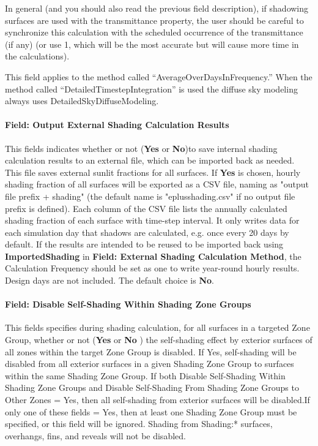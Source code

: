 In general (and you should also read the previous field description), if shadowing surfaces are used with the transmittance property, the user should be careful to synchronize this calculation with the scheduled occurrence of the transmittance (if any) (or use 1, which will be the most accurate but will cause more time in the calculations).

This field applies to the method called ``AverageOverDaysInFrequency.'' When the method called ``DetailedTimestepIntegration'' is used the diffuse sky modeling always uses DetailedSkyDiffuseModeling.

\paragraph{Field: Output External Shading Calculation Results}\label{field-output-external-shading-calculation results}
This fields indicates whether or not (\textbf{Yes} or \textbf{No})to save internal shading calculation results to an external file, which can be imported back as needed. This file saves external sunlit fractions for all surfaces. If \textbf{Yes} is chosen, hourly shading fraction of all surfaces will be exported as a CSV file, naming as "output file prefix + shading" (the default name is "eplusshading.csv" if no output file prefix is defined). Each column of the CSV file lists the annually calculated shading fraction of each surface with time-step interval. It only writes data for each simulation day that shadows are calculated, e.g. once every 20 days by default. If the results are intended to be reused to be imported  back using \textbf{ImportedShading} in \textbf{Field: External Shading Calculation Method}, the Calculation Frequency should be set as one to write year-round hourly results. Design days are not included. The default choice is \textbf{No}.

\paragraph{Field: Disable Self-Shading Within Shading Zone Groups}\label{fieldself--disable-shading-within-a-zone-group}
This fields specifies during shading calculation, for all surfaces in a targeted Zone Group, whether or not (\textbf{Yes} or \textbf{No} ) the self-shading effect by exterior surfaces of all zones within the target Zone Group is disabled. If Yes, self-shading will be disabled from all exterior surfaces in a given Shading Zone Group to surfaces within the same Shading Zone Group. If both Disable Self-Shading Within Shading Zone Groups and Disable Self-Shading From Shading Zone Groups to Other Zones = Yes, then all self-shading from exterior surfaces will be disabled.If only one of these fields = Yes, then at least one Shading Zone Group must be specified, or this field will be ignored. Shading from Shading:* surfaces, overhangs, fins, and reveals will not be disabled.

